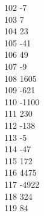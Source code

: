 { 102	-7 \\
 103	7 \\
 104	23 \\
 105	-41 \\
 106	49 \\
 107	-9 \\
 108	1605 \\
 109	-621 \\
 110	-1100 \\
 111	230 \\
 112	-138 \\
 113	-5 \\
 114	-47 \\
 115	172 \\
 116	4475 \\
 117	-4922 \\
 118	324 \\
 119	84 \\
}
